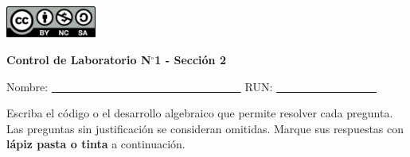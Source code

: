 \documentclass[11pt,oneside,spanish]{article}
\theoremstyle{definition}
\theoremstyle{definition}\newtheorem{definicion}{Definicin}
\theoremstyle{definition}\newtheorem{ejemplo}{Ejemplo}
\theoremstyle{remark}\newtheorem{nota}{\textsc{Nota}}
\theoremstyle{definition}\newtheorem{proposicion}{Proposicin}
\theoremstyle{definition}\newtheorem{problema}{Problema}
\begin{document}
\thispagestyle{fancy}

\includegraphics[width=8em]{by-nc-sa.pdf}

\begin{center}
\textbf{Control de Laboratorio N$^\circ$1  - Secci\'on 2} 
\end{center}

\bigskip

Nombre: \underline{\textcolor{white}{---------------------------------------------------}} \hspace{2mm} RUN: \underline{\textcolor{white}{---------------------------}}

\bigskip

Escriba el c\'odigo o el desarrollo algebraico que permite resolver cada pregunta. Las preguntas sin justificaci\'on se consideran omitidas. Marque sus respuestas con \textbf{l\'apiz pasta o tinta} a continuaci\'on.

\bigskip


\newpage
\end{document}
